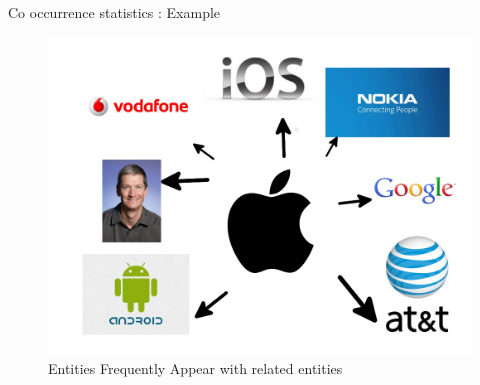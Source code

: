 \documentclass{beamer}
\begin{document}
\begin{frame}{Co occurrence statistics : Example}
 \begin{figure}[h]
 \centering
 \includegraphics[bb=0 0 1024 768, scale=0.25]{./entitycoocc.png}
 \caption{Entities Frequently Appear with related entities}
\end{figure}

\end{frame}



\end{document}
